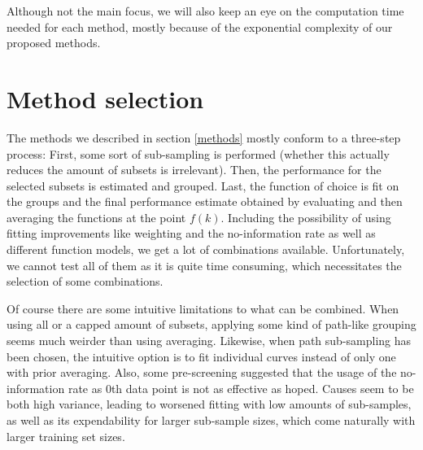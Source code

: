 Although not the main focus, we will also keep an eye on the computation time needed for each method, mostly because of the exponential complexity of our proposed methods.

\section{Method selection}

The methods we described in section \ref{methods} mostly conform to a three-step process: First, some sort of sub-sampling is performed (whether this actually reduces the amount of subsets is irrelevant). Then, the performance for the selected subsets is estimated and grouped. Last, the function of choice is fit on the groups and the final performance estimate obtained by evaluating and then averaging the functions at the point $f(k)$. Including the possibility of using fitting improvements like weighting and the no-information rate as well as different function models, we get a lot of combinations available. Unfortunately, we cannot test all of them as it is quite time consuming, which necessitates the selection of some combinations.

Of course there are some intuitive limitations to what can be combined. When using all or a capped amount of subsets, applying some kind of path-like grouping seems much weirder than using averaging. Likewise, when path sub-sampling has been chosen, the intuitive option is to fit individual curves instead of only one with prior averaging. Also, some pre-screening suggested that the usage of the no-information rate as 0th data point is not as effective as hoped. Causes seem to be both high variance, leading to worsened fitting with low amounts of sub-samples, as well as its expendability for larger sub-sample sizes, which come naturally with larger training set sizes.

